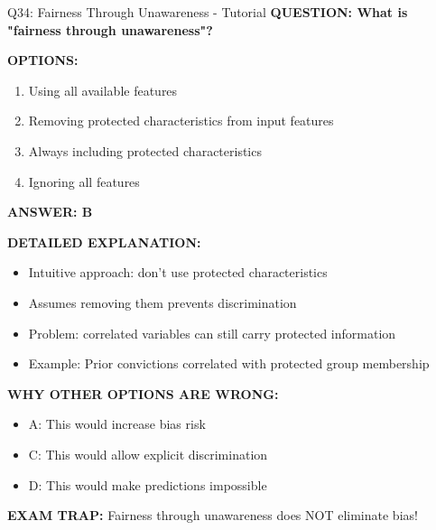 \documentclass[8pt]{beamer}
\begin{document}
	\begin{frame}{Q34: Fairness Through Unawareness - Tutorial}
		\fontsize{6.5}{7.5}\selectfont
		\textbf{QUESTION: What is "fairness through unawareness"?}
		
		\vspace{0.1cm}
		\textbf{OPTIONS:}
		\begin{enumerate}
			\item Using all available features
			\item Removing protected characteristics from input features
			\item Always including protected characteristics
			\item Ignoring all features
		\end{enumerate}
		
		\vspace{0.1cm}
		\textcolor{myblue}{\textbf{ANSWER: B}}
		
		\vspace{0.1cm}
		\textbf{DETAILED EXPLANATION:}
		\begin{itemize}
			\item Intuitive approach: don't use protected characteristics
			\item Assumes removing them prevents discrimination
			\item Problem: correlated variables can still carry protected information
			\item Example: Prior convictions correlated with protected group membership
		\end{itemize}
		
		\vspace{0.1cm}
		\textcolor{myred}{\textbf{WHY OTHER OPTIONS ARE WRONG:}}
		\begin{itemize}
			\item \textcolor{myred}{A:} This would increase bias risk
			\item \textcolor{myred}{C:} This would allow explicit discrimination
			\item \textcolor{myred}{D:} This would make predictions impossible
		\end{itemize}
		
		\textcolor{myred}{\textbf{EXAM TRAP:}} Fairness through unawareness \textcolor{myblue}{does NOT eliminate bias}!
	\end{frame}
	
\end{document}
